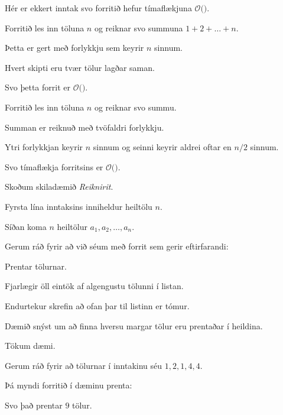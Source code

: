 {
	{
		\item<1-> Hér er ekkert inntak svo forritið hefur tímaflækjuna $\mathcal{O}($\onslide<2->{$\ 1\ $}$)$.
	}
}

{
	{
		\item<1-> Forritið les inn töluna $n$ og reiknar svo summuna $1 + 2 + \dots + n$.
		\item<2-> Þetta er gert með forlykkju sem keyrir $n$ sinnum.
		\item<3-> Hvert skipti eru tvær tölur lagðar saman.
		\item<4-> Svo þetta forrit er $\mathcal{O}($\onslide<5->{$\ n\ $}$)$.
	}
}

{
	{
		\item<1-> Forritið les inn töluna $n$ og reiknar svo summu.
		\item<2-> Summan er reiknuð með tvöfaldri forlykkju.
		\item<3-> Ytri forlykkjan keyrir $n$ sinnum og seinni keyrir aldrei oftar en $n/2$ sinnum.
		\item<4-> Svo tímaflækja forritsins er $\mathcal{O}($\onslide<5->{$n^2$}$)$.
	}
}

{
	{
		\item<1-> Skoðum skiladæmið \emph{Reiknirit}.
		\item<2-> Fyrsta lína inntaksins inniheldur heiltölu $n$.
		\item<3-> Síðan koma $n$ heiltölur $a_1, a_2, \dots, a_n$.
		\item<4-> Gerum ráð fyrir að við séum með forrit sem gerir eftirfarandi:
		{
			\item<5-> Prentar tölurnar.
			\item<6-> Fjarlægir öll eintök af algengustu tölunni í listan.
			\item<7-> Endurtekur skrefin að ofan þar til listinn er tómur.
		}
		\item<8-> Dæmið snýst um að finna hversu margar tölur eru prentaðar í heildina.
		\item<9-> Tökum dæmi.
	}
}

{
	{
		\item<1-> Gerum ráð fyrir að tölurnar í inntakinu séu $1, 2, 1, 4, 4$.
		\item<2-> Þá myndi forritið í dæminu prenta:
		\item<3->[] 
		\item<4-> Svo það prentar $9$ tölur.
	}
}

